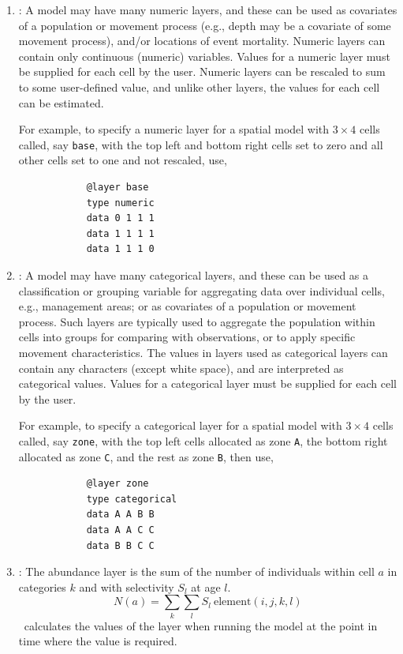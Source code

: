 \begin{enumerate}
	\item{\label{numeric-layer}}: A model may have many numeric layers, and these can be used as covariates of a population or movement process (e.g., depth may be a covariate of some movement process), and/or locations of event mortality. Numeric layers can contain only continuous (numeric) variables. Values for a numeric layer must be supplied for each cell by the user. Numeric layers can be rescaled to sum to some user-defined value, and unlike other layers, the values for each cell can be estimated. 
	
	For example, to specify a numeric layer for a spatial model with $3 \times 4$ cells called, say \texttt{base}, with the top left and bottom right cells set to zero and all other cells set to one and not rescaled, use,
	{\small{\begin{verbatim}
			@layer base
			type numeric
			data 0 1 1 1
			data 1 1 1 1
			data 1 1 1 0
			\end{verbatim}}}
	
	\item {\label{categorical-layer}}: A model may have many categorical layers, and these can be used as a classification or grouping variable for aggregating data over individual cells, e.g., management areas; or as covariates of a population or movement process. Such layers are typically used to aggregate the population within cells into groups for comparing with observations, or to apply specific movement characteristics. The values in layers used as categorical layers can contain any characters (except white space), and are interpreted as categorical values. Values for a categorical layer must be supplied for each cell by the user.
	
	For example, to specify a categorical layer for a spatial model with $3 \times 4$ cells called, say \texttt{zone}, with the top left cells allocated as zone \texttt{A}, the bottom right allocated as zone \texttt{C}, and the rest as zone \texttt{B}, then use,
	{\small{\begin{verbatim}
			@layer zone
			type categorical
			data A A B B
			data A A C C
			data B B C C
			\end{verbatim}}}
	
	
	\item{}: The abundance layer is the sum of the number of individuals within cell $a$ in categories $k$ and with selectivity $S_l$ at age $l$. 
	\begin{equation}
	N(a) = \sum\limits_{k} \sum\limits_l S_l \ \text{element}(i,j,k,l)
	\end{equation}
	\IBM\ calculates the values of the layer when running the model at the point in time where the value is required.
	

\end{enumerate}
